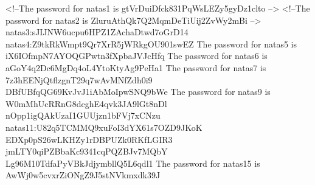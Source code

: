 <!--The password for natas1 is gtVrDuiDfck831PqWsLEZy5gyDz1clto -->
<!--The password for natas2 is ZluruAthQk7Q2MqmDeTiUij2ZvWy2mBi -->
natas3:sJIJNW6ucpu6HPZ1ZAchaDtwd7oGrD14
natas4:Z9tkRkWmpt9Qr7XrR5jWRkgOU901swEZ
The password for natas5 is iX6IOfmpN7AYOQGPwtn3fXpbaJVJcHfq
The password for natas6 is aGoY4q2Dc6MgDq4oL4YtoKtyAg9PeHa1
The password for natas7 is 7z3hEENjQtflzgnT29q7wAvMNfZdh0i9
DBfUBfqQG69KvJvJ1iAbMoIpwSNQ9bWe
The password for natas9 is W0mMhUcRRnG8dcghE4qvk3JA9lGt8nDl
nOpp1igQAkUzaI1GUUjzn1bFVj7xCNzu
natas11:U82q5TCMMQ9xuFoI3dYX61s7OZD9JKoK
EDXp0pS26wLKHZy1rDBPUZk0RKfLGIR3
jmLTY0qiPZBbaKc9341cqPQZBJv7MQbY
Lg96M10TdfaPyVBkJdjymbllQ5L6qdl1
The password for natas15 is AwWj0w5cvxrZiONgZ9J5stNVkmxdk39J
